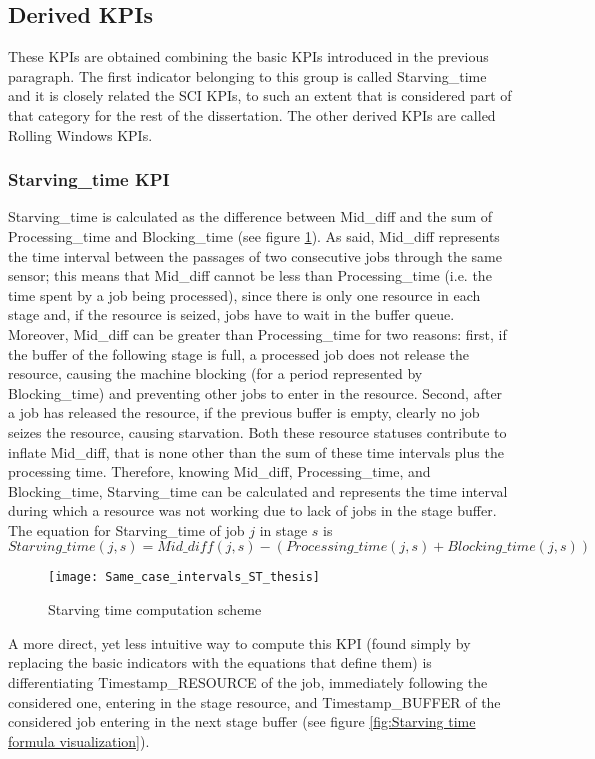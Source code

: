 \subsection{Derived KPIs}
\label{Derived KPIs}
These KPIs are obtained combining the basic KPIs introduced in the previous paragraph. The first indicator belonging to this group is called Starving\_time and it is closely related the SCI KPIs, to such an extent that is considered part of that category for the rest of the dissertation. The other derived KPIs are called Rolling Windows KPIs.
\subsubsection{Starving\_time KPI}
Starving\_time is calculated as the difference between Mid\_diff and the sum of Processing\_time and Blocking\_time (see figure \ref{fig:Starving time scheme}). As said, Mid\_diff represents the time interval between the passages of two consecutive jobs through the same sensor; this means that Mid\_diff cannot be less than Processing\_time (i.e. the time spent by a job being processed), since there is only one resource in each stage and, if the resource is seized, jobs have to wait in the buffer queue. Moreover, Mid\_diff can be greater than Processing\_time for two reasons: first, if the buffer of the following stage is full, a processed job does not release the resource, causing the machine blocking (for a period represented by Blocking\_time) and preventing other jobs to enter in the resource. Second, after a job has released the resource, if the previous buffer is empty, clearly no job seizes the resource, causing starvation. Both these resource statuses contribute to inflate Mid\_diff, that is none other than the sum of these time intervals plus the processing time. Therefore, knowing Mid\_diff, Processing\_time, and Blocking\_time, Starving\_time can be calculated and represents the time interval during which a resource was not working due to lack of jobs in the stage buffer.\\
The equation for Starving\_time of job $j$ in stage $s$ is 
\[Starving\_time(j,s)=Mid\_diff(j,s) - (Processing\_time(j,s)+Blocking\_time(j,s))\]
\begin{figure}[H] 
\centering
\texttt{[image: Same\_case\_intervals\_ST\_thesis]}
\caption[Starving time computation scheme]{Starving time computation scheme}
\label{fig:Starving time scheme}
\end{figure}
A more direct, yet less intuitive way to compute this KPI (found simply by replacing the basic indicators with the equations that define them) is differentiating Timestamp\_RESOURCE of the job, immediately following the considered one, entering in the stage resource, and Timestamp\_BUFFER of the considered job entering in the next stage buffer (see figure \ref{fig:Starving time formula visualization}). \\
